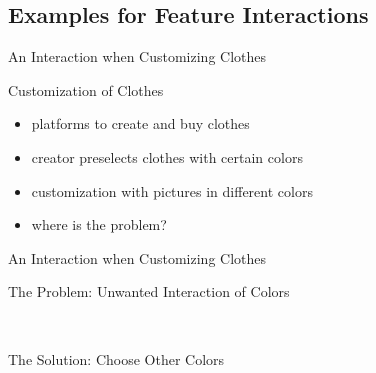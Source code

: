 \subsection{Examples for Feature Interactions}


\begin{frame}{An Interaction when Customizing Clothes}
	\begin{mycolumns}[widths={33},animation=none]
		\begin{example}{Customization of Clothes}
			\begin{itemize}
			\item platforms to create and buy clothes
			\item creator preselects clothes with certain colors
			\item customization with pictures in different colors
			\item where is the problem?
			\end{itemize}
		\end{example}
	\mynextcolumn
	\end{mycolumns}
\end{frame}
\begin{frame}{An Interaction when Customizing Clothes}
	\begin{mycolumns}
		\begin{exampletight}{The Problem: Unwanted Interaction of Colors}
			~

			\centering{}

			~
		\end{exampletight}
	\mynextcolumn
		\begin{exampletight}{The Solution: Choose Other Colors}
			~

			\centering{}

			~
		\end{exampletight}
	\end{mycolumns}
\end{frame}
